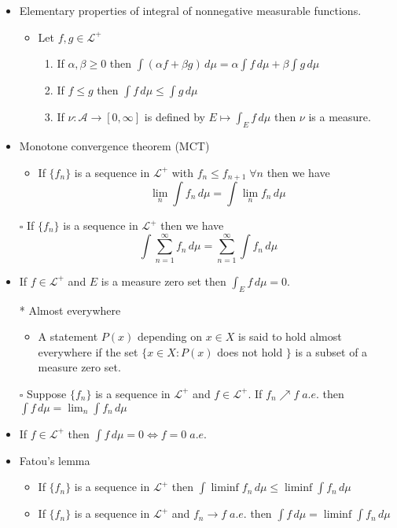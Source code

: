 \documentclass[12pt]{article}
\newcommand{\sq}{$\square$}
\newcommand{\A}{\mathcal{A}}
\newcommand{\LL}{\mathcal{L}}
\begin{document}
\begin{itemize}
\begin{itemize}
    \end{itemize}
    \item Elementary properties of integral of nonnegative measurable functions.
    \begin{itemize}
        \item Let $f,g\in \LL^+$ 
        \begin{enumerate}
            \item If $\alpha, \beta\geq 0$ then $\int (\alpha f+\beta g)\, d\mu=\alpha \int f \, d\mu+\beta \int g \, d\mu$
            \item If $f\leq g$ then $\int f \, d\mu \leq \int g \, d\mu$ 
            \item If $\nu : \A \rightarrow [0,\infty]$ is defined by $E\mapsto \int_E f \, d\mu$ then $\nu$ is a measure.
        \end{enumerate}    
    \end{itemize}
    \item Monotone convergence theorem (MCT)
    \begin{itemize}
        \item If $\{f_n\}$ is a sequence in $\LL^+$ with $f_n\leq f_{n+1}\; \forall n$ then we have $$\lim_n \int f_n \, d\mu= \int \lim_n f_n \, d\mu$$ 
    \end{itemize}
    \item[\sq] If $\{f_n\}$ is a sequence in $\LL^+$ then we have $$ \int \sum_{n=1}^\infty f_n \, d\mu= \sum_{n=1}^\infty \int f_n \, d\mu$$
    \item If $f\in \LL^+$ and $E$ is a measure zero set then $\int_E f\, d\mu=0$.
    \item[*] Almost everywhere
    \begin{itemize}
        \item A statement $P(x)$ depending on $x\in X$ is said to hold almost everywhere if the set $\{x\in X : P(x)$ does not hold $\}$ is a subset of a measure zero set.
    \end{itemize} 
    \item[\sq] Suppose $\{f_n\}$ is a sequence in $\LL^+$ and $f\in \LL^+$. If $f_n\nearrow f\; a.e.$ then $\int f \, d\mu= \lim_n \int f_n \, d\mu$
    \item If $f\in \LL^+$ then $\int f \, d\mu=0 \Leftrightarrow f=0 \; a.e.$
    \item Fatou's lemma
    \begin{itemize}
        \item If $\{f_n\}$ is a sequence in $\LL^+$ then $\int \liminf f_n \, d\mu\leq \liminf \int f_n\, d\mu$
        \item If $\{f_n\}$ is a sequence in $\LL^+$ and $f_n\rightarrow f\; a.e.$ then $\int f \, d\mu = \liminf\int f_n \, d\mu$ 
    \end{itemize}
\end{itemize}
\smallskip
\end{document}
